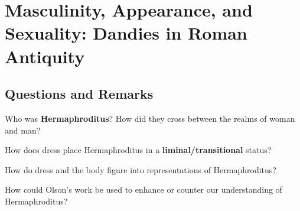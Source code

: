 %
%
%
\chapter{Masculinity, Appearance, and Sexuality: Dandies in Roman Antiquity}
\label{mascApp} %








\abstract{}

\section{Questions and Remarks}
\label{sec:QR12}

\begin{qst}
    Who was \textbf{Hermaphroditus}? How did they cross between the realms of woman and man?
\end{qst}


\begin{qst}
    How does dress place Hermaphroditus in a \textbf{liminal/transitional} status?
\end{qst}

\begin{qst}
    How do dress and the body figure into representations of Hermaphroditus?
\end{qst}


\begin{qst}
    How could Olson's work be used to enhance or counter our understanding of Hermaphroditus?
\end{qst}


